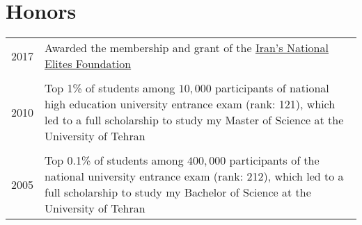 \section*{Honors}{}

\begin{tabular}{rll}
    2017 & \multicolumn{2}{p{0.9\textwidth}}{Awarded the membership and grant of the \href{http://en.bmn.ir/}{Iran's National Elites Foundation}} \\
    \multicolumn{2}{c}{} \\
    2010 & \multicolumn{2}{p{0.9\textwidth}}{Top 1\% of students among $10,000$ participants of national high education university entrance exam (rank: 121), which led to a full scholarship to study my Master of Science at the University of Tehran} \\
    \multicolumn{2}{c}{} \\	
    2005 & \multicolumn{2}{p{0.9\textwidth}}{Top 0.1\% of students among $400,000$ participants of the national university entrance exam (rank: 212), which led to a full scholarship to study my Bachelor of Science at the University of Tehran} \\
\end{tabular}
